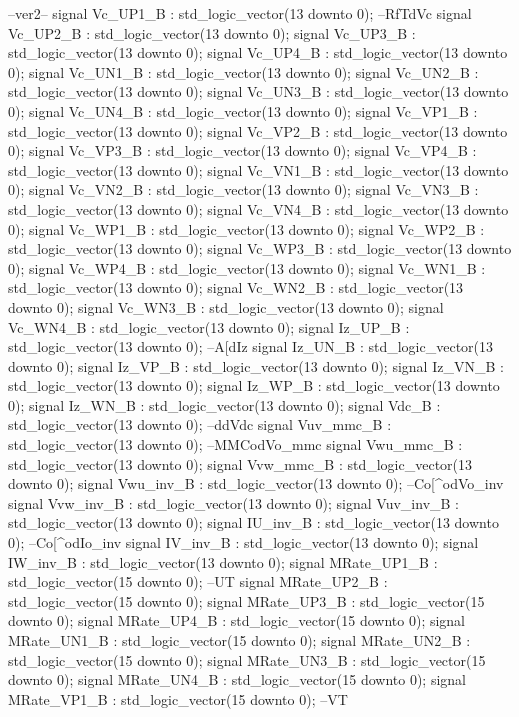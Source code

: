 \begin{mylisting}[language=VHDL,caption=トップモジュール,label=appF_Top_module_VHDL]
		--ver2--
	signal Vc_UP1_B		: std_logic_vector(13 downto 0);		--RfTdVc
	signal Vc_UP2_B		: std_logic_vector(13 downto 0);
	signal Vc_UP3_B		: std_logic_vector(13 downto 0);
	signal Vc_UP4_B		: std_logic_vector(13 downto 0);
	signal Vc_UN1_B		: std_logic_vector(13 downto 0);
	signal Vc_UN2_B		: std_logic_vector(13 downto 0);
	signal Vc_UN3_B		: std_logic_vector(13 downto 0);
	signal Vc_UN4_B		: std_logic_vector(13 downto 0);
	signal Vc_VP1_B		: std_logic_vector(13 downto 0);
	signal Vc_VP2_B		: std_logic_vector(13 downto 0);
	signal Vc_VP3_B		: std_logic_vector(13 downto 0);
	signal Vc_VP4_B		: std_logic_vector(13 downto 0);
	signal Vc_VN1_B		: std_logic_vector(13 downto 0);
	signal Vc_VN2_B		: std_logic_vector(13 downto 0);
	signal Vc_VN3_B		: std_logic_vector(13 downto 0);
	signal Vc_VN4_B		: std_logic_vector(13 downto 0);
	signal Vc_WP1_B		: std_logic_vector(13 downto 0);
	signal Vc_WP2_B		: std_logic_vector(13 downto 0);
	signal Vc_WP3_B		: std_logic_vector(13 downto 0);
	signal Vc_WP4_B		: std_logic_vector(13 downto 0);
	signal Vc_WN1_B		: std_logic_vector(13 downto 0);
	signal Vc_WN2_B		: std_logic_vector(13 downto 0);
	signal Vc_WN3_B		: std_logic_vector(13 downto 0);
	signal Vc_WN4_B		: std_logic_vector(13 downto 0);
	signal Iz_UP_B			: std_logic_vector(13 downto 0);		--A[dIz
	signal Iz_UN_B			: std_logic_vector(13 downto 0);
	signal Iz_VP_B			: std_logic_vector(13 downto 0);
	signal Iz_VN_B			: std_logic_vector(13 downto 0);
	signal Iz_WP_B			: std_logic_vector(13 downto 0);
	signal Iz_WN_B			: std_logic_vector(13 downto 0);
	signal Vdc_B			: std_logic_vector(13 downto 0);			--ddVdc
	signal Vuv_mmc_B		: std_logic_vector(13 downto 0);		--MMCodVo_mmc
	signal Vwu_mmc_B		: std_logic_vector(13 downto 0);
	signal Vvw_mmc_B		: std_logic_vector(13 downto 0);
	signal Vwu_inv_B		: std_logic_vector(13 downto 0);		--Co[^odVo_inv
	signal Vvw_inv_B		: std_logic_vector(13 downto 0);
	signal Vuv_inv_B		: std_logic_vector(13 downto 0);
	signal IU_inv_B		: std_logic_vector(13 downto 0);		--Co[^odIo_inv
	signal IV_inv_B		: std_logic_vector(13 downto 0);
	signal IW_inv_B		: std_logic_vector(13 downto 0);
	signal MRate_UP1_B	: std_logic_vector(15 downto 0);		--UT
	signal MRate_UP2_B	: std_logic_vector(15 downto 0);
	signal MRate_UP3_B	: std_logic_vector(15 downto 0);
	signal MRate_UP4_B	: std_logic_vector(15 downto 0);
	signal MRate_UN1_B	: std_logic_vector(15 downto 0);
	signal MRate_UN2_B	: std_logic_vector(15 downto 0);
	signal MRate_UN3_B	: std_logic_vector(15 downto 0);
	signal MRate_UN4_B	: std_logic_vector(15 downto 0);
	signal MRate_VP1_B	: std_logic_vector(15 downto 0);		--VT

\end{mylisting}
